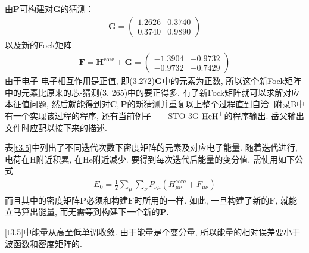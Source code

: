 由$\mathbf{P}$可构建对$\mathbf{G}$的猜测：
\begin{align}
	\mathbf{G}=\begin{pmatrix}
		1.2626&0.3740\\0.3740&0.9890
	\end{pmatrix}
\end{align}
以及新的Fock矩阵
\begin{align}
	\mathbf{F=H}^\mathrm{core}+\mathbf{G}=
	\begin{pmatrix}
		-1.3904&-0.9732 \\ -0.9732&-0.7429
	\end{pmatrix}
\end{align}
由于电子-电子相互作用是正值, 
即(3.272)$\mathbf{G}$中的元素为正数, 
所以这个新Fock矩阵中的元素比原来的芯-\ha 猜测(3.
265)中的要正得多. 
有了新Fock矩阵就可以求解对应本征值问题, 
然后就能得到对$\mathbf{C,P}$的新猜测并重复以上整个过程直到自洽. 
附录B中有一个实现该过程的程序, 
还有当前例子——STO-3G $\mathrm{HeH}^+$的程序输出. 
岳父输出文件时应配以接下来的描述.


表\ref{t3.5}中列出了不同迭代次数下密度矩阵的元素及对应电子能量. 
随着迭代进行, 
电荷在$\mathrm{H}$附近积累, 
在$\mathrm{He}$附近减少. 
要得到每次迭代后能量的变分值, 
需使用如下公式
\begin{align}
	E_0 = \frac{1}{2}\sum_\mu\sum_\nu P_{\nu\mu}(H_{\mu\nu}^\mathrm{core}+F_{\mu\nu})
\end{align}
而且其中的密度矩阵$\mathbf{P}$必须和构建$\mathbf{F}$时所用的一样. 
如此, 
一旦构建了新的$\mathbf{F}$, 
就能立马算出能量, 
而无需等到构建下一个新的$\mathbf{P}$. 

\ref{t3.5}中能量从高至低单调收敛. 由于能量是个变分量, 所以能量的相对误差要小于波函数和密度矩阵的. 

